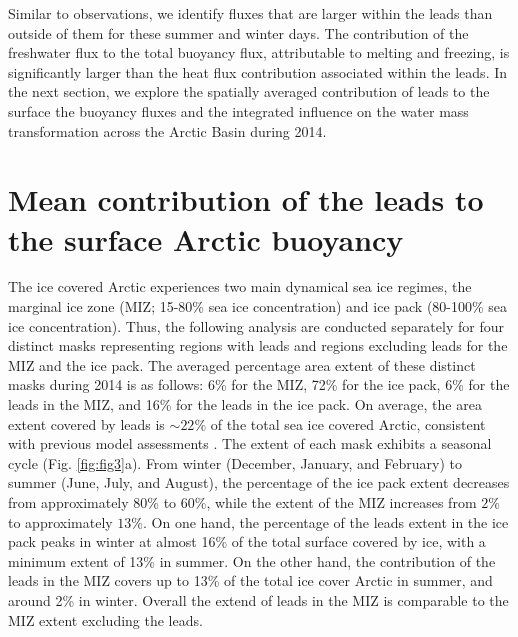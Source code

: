 \documentclass[lineno,sn-basic]{sn-jnl}%
\begin{document}
Similar to observations, we identify fluxes that are larger within the leads than outside of them for these summer and winter days. The contribution of the freshwater flux to the total buoyancy flux, attributable to melting and freezing, is significantly larger than the heat flux contribution associated within the leads. In the next section, we explore the spatially averaged contribution of leads to the surface the buoyancy fluxes and the integrated influence on the water mass transformation across the Arctic Basin during 2014. 

\section{Mean contribution of the leads to the surface Arctic buoyancy}\label{sec3}

The ice covered Arctic experiences two main dynamical sea ice regimes, the marginal ice zone (MIZ; 15-80\% sea ice concentration) and ice pack (80-100\% sea ice concentration). Thus, the following analysis are conducted separately for four distinct masks representing regions with leads and regions excluding leads for the MIZ and the ice pack. The averaged percentage area extent of these distinct masks during 2014 is as follows: 6\% for the MIZ, 72\% for the ice pack, 6\% for the leads in the MIZ, and 16\% for the leads in the ice pack. On average, the area extent covered by leads is $\sim 22\%$ of the total sea ice covered Arctic, consistent with previous model assessments \citep{Wang_leads_2016}. 
The extent of each mask exhibits a seasonal cycle (Fig. \ref{fig:fig3}a). From winter (December, January, and February) to  summer (June, July, and August), the percentage of the ice pack extent decreases from approximately $80\%$ to $60\%$, while the extent of the MIZ increases from $2\%$ to approximately $13\%$. 
On one hand, the percentage of the leads extent in the ice pack peaks in winter at almost 16\% of the total surface covered by ice, with a minimum extent of 13\% in summer. On the other hand, the contribution of the leads in the MIZ covers up to 13\% of the total ice cover Arctic in summer, and around 2\% in winter. Overall the extend of leads in the MIZ is comparable to the MIZ extent excluding the leads. 
\end{document}
